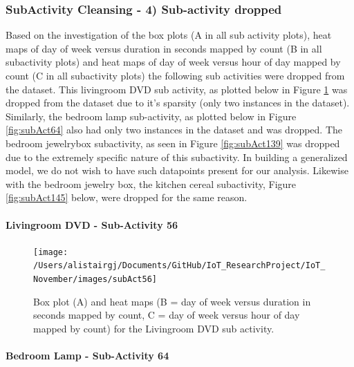 \documentclass[11pt,]{article}
\let\oldparagraph\paragraph
\renewcommand{\paragraph}[1]{\oldparagraph{#1}\mbox{}}
\begin{document}
\hypertarget{subactivity-cleansing---4-sub-activity-dropped}{%
\subsubsection{SubActivity Cleansing - 4) Sub-activity
dropped}\label{subactivity-cleansing---4-sub-activity-dropped}}

Based on the investigation of the box plots (A in all sub activity
plots), heat maps of day of week versus duration in seconds mapped by
count (B in all subactivity plots) and heat maps of day of week versus
hour of day mapped by count (C in all subactivity plots) the following
sub activities were dropped from the dataset. This livingroom DVD sub
activity, as plotted below in Figure \ref{fig:subAct56} was dropped from
the dataset due to it's sparsity (only two instances in the dataset).
Similarly, the bedroom lamp sub-activity, as plotted below in Figure
\ref{fig:subAct64} also had only two instances in the dataset and was
dropped. The bedroom jewelrybox subactivity, as seen in Figure
\ref{fig:subAct139} was dropped due to the extremely specific nature of
this subactivity. In building a generalized model, we do not wish to
have such datapoints present for our analysis. Likewise with the bedroom
jewelry box, the kitchen cereal subactivity, Figure \ref{fig:subAct145}
below, were dropped for the same reason.

\hypertarget{livingroom-dvd---sub-activity-56}{%
\paragraph{Livingroom DVD - Sub-Activity
56}\label{livingroom-dvd---sub-activity-56}}

\begin{figure}[H]

{\centering \texttt{[image: /Users/alistairgj/Documents/GitHub/IoT\_ResearchProject/IoT\_November/images/subAct56]} 

}

\caption{Box plot (A) and heat maps (B = day of week versus duration in seconds mapped by count, C = day of week versus hour of day mapped by count) for the Livingroom DVD sub activity.}\label{fig:subAct56}
\end{figure}

\hypertarget{bedroom-lamp---sub-activity-64}{%
\paragraph{Bedroom Lamp - Sub-Activity
64}\label{bedroom-lamp---sub-activity-64}}
\end{document}
